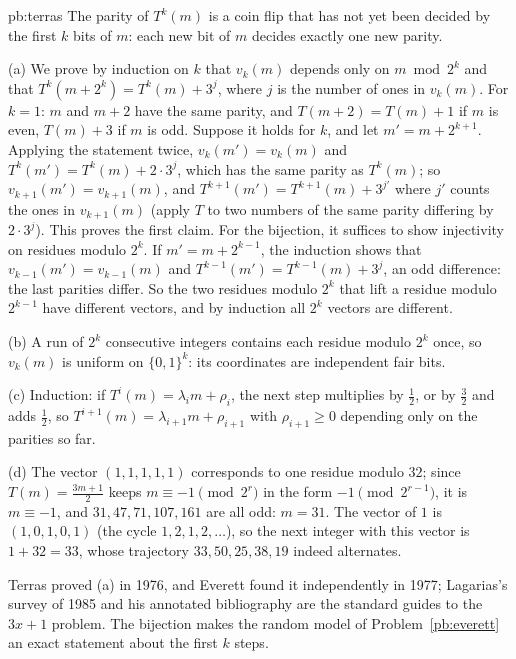 \begin{solution}{pb:terras}
\idea The parity of $T^k(m)$ is a coin flip that has not yet been decided by the first $k$ bits of $m$: each new bit of $m$ decides exactly
one new parity.

\writeup (a) We prove by induction on $k$ that $v_k(m)$ depends only on $m\bmod2^k$ and that $T^k(m+2^k)=T^k(m)+3^j$, where $j$ is the number of ones in $v_k(m)$. For
$k=1$: $m$ and $m+2$ have the same parity, and $T(m+2)=T(m)+1$ if $m$ is even, $T(m)+3$ if $m$ is odd. Suppose it holds for $k$, and let $m'=m+2^{k+1}$.
Applying the statement twice, $v_k(m')=v_k(m)$ and $T^k(m')=T^k(m)+2\cdot3^j$, which has the same parity as $T^k(m)$; so $v_{k+1}(m')=v_{k+1}(m)$, and
$T^{k+1}(m')=T^{k+1}(m)+3^{j'}$ where $j'$ counts the ones in $v_{k+1}(m)$ (apply $T$ to two numbers of the same parity differing by $2\cdot3^j$). This proves the
first claim. For the bijection, it suffices to show injectivity on residues modulo $2^k$. If $m'=m+2^{k-1}$, the induction shows that
$v_{k-1}(m')=v_{k-1}(m)$ and $T^{k-1}(m')=T^{k-1}(m)+3^{j}$, an odd difference: the last parities differ. So the two residues modulo $2^k$ that lift a residue
modulo $2^{k-1}$ have different vectors, and by induction all $2^k$ vectors are different.

(b) A run of $2^k$ consecutive integers contains each residue modulo $2^k$ once, so $v_k(m)$ is uniform on $\{0,1\}^k$: its coordinates are independent
fair bits.

(c) Induction: if $T^i(m)=\lambda_im+\rho_i$, the next step multiplies by $\frac12$, or by $\frac32$ and adds $\frac12$, so $T^{i+1}(m)=\lambda_{i+1}m+\rho_{i+1}$ with $\rho_{i+1}\ge0$
depending only on the parities so far.

(d) The vector $(1,1,1,1,1)$ corresponds to one residue modulo $32$; since $T(m)=\frac{3m+1}2$ keeps $m\equiv-1\pmod{2^r}$ in the form $-1\pmod{2^{r-1}}$, it is
$m\equiv-1$, and $31,47,71,107,161$ are all odd: $m=31$. The vector of $1$ is $(1,0,1,0,1)$ (the cycle $1,2,1,2,\dots$), so the next integer with this vector is
$1+32=33$, whose trajectory $33,50,25,38,19$ indeed alternates.

\leads Terras proved (a) in 1976, and Everett found it independently in 1977; Lagarias's survey of 1985 and his annotated bibliography
are the standard guides to the $3x+1$ problem. The bijection makes the random model of Problem~\ref{pb:everett} an exact statement about
the first $k$ steps.
\end{solution}

